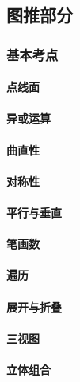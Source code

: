 \subsection{图推部分}

\subsubsection{基本考点}

\paragraph{点线面}

\paragraph{异或运算}

\paragraph{曲直性}

\paragraph{对称性}

\paragraph{平行与垂直}

\paragraph{笔画数}

\paragraph{遍历}

\paragraph{展开与折叠}

\paragraph{三视图}

\paragraph{立体组合}


